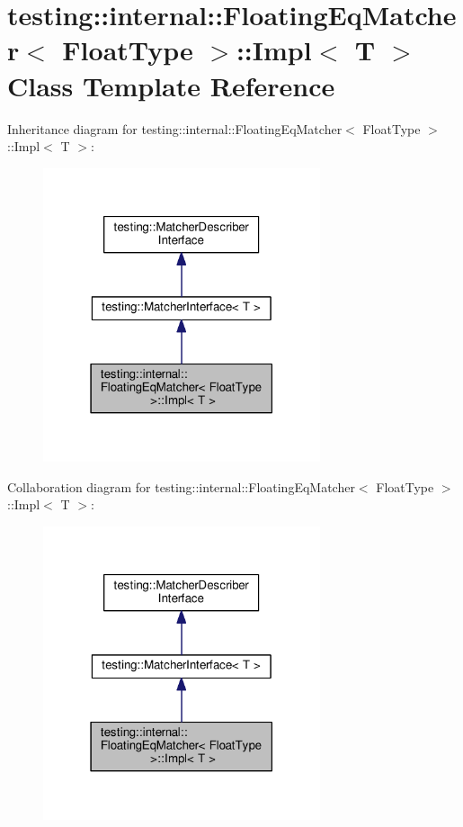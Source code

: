 \hypertarget{classtesting_1_1internal_1_1FloatingEqMatcher_1_1Impl}{}\section{testing\+:\+:internal\+:\+:Floating\+Eq\+Matcher$<$ Float\+Type $>$\+:\+:Impl$<$ T $>$ Class Template Reference}
\label{classtesting_1_1internal_1_1FloatingEqMatcher_1_1Impl}


Inheritance diagram for testing\+:\+:internal\+:\+:Floating\+Eq\+Matcher$<$ Float\+Type $>$\+:\+:Impl$<$ T $>$\+:\nopagebreak
\begin{figure}[H]
\begin{center}
\leavevmode
\includegraphics[width=231pt]{classtesting_1_1internal_1_1FloatingEqMatcher_1_1Impl__inherit__graph}
\end{center}
\end{figure}


Collaboration diagram for testing\+:\+:internal\+:\+:Floating\+Eq\+Matcher$<$ Float\+Type $>$\+:\+:Impl$<$ T $>$\+:\nopagebreak
\begin{figure}[H]
\begin{center}
\leavevmode
\includegraphics[width=231pt]{classtesting_1_1internal_1_1FloatingEqMatcher_1_1Impl__coll__graph}
\end{center}
\end{figure}
